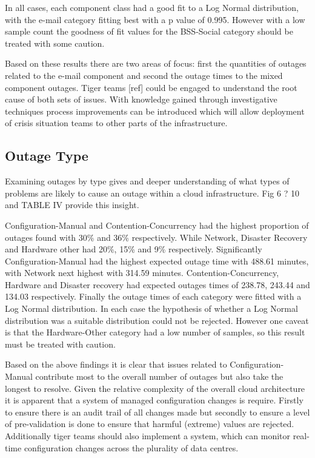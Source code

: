 \documentclass[conference]{IEEEtran}
\begin{document}
In all cases, each component class had a good fit to a Log Normal distribution, with the e-mail category fitting best with a p value of 0.995. However with a low sample count the goodness of fit values for the BSS-Social category should be treated with some caution. \par

Based on these results there are two areas of focus: first the quantities of outages related to the e-mail component and second the outage times to the mixed component outages. Tiger teams [ref] could be engaged to understand the root cause of both sets of issues. With knowledge gained through investigative techniques process improvements can be introduced which will allow deployment of crisis situation teams to other parts of the infrastructure. \par

\subsection{Outage Type}
Examining outages by type gives and deeper understanding of what types of problems are likely to cause an outage within a cloud infrastructure. Fig 6 ? 10 and TABLE IV provide this insight. \par

Configuration-Manual and Contention-Concurrency had the highest proportion of outages found with 30\% and 36\% respectively. While Network, Disaster Recovery and Hardware other had 20\%, 15\% and 9\% respectively. Significantly Configuration-Manual had the highest expected outage time with 488.61 minutes, with Network next highest with 314.59 minutes. Contention-Concurrency, Hardware and Disaster recovery had expected outages times of 238.78, 243.44 and 134.03 respectively. Finally the outage times of each category were fitted with a Log Normal distribution. In each case the hypothesis of whether a Log Normal distribution was a suitable distribution could not be rejected. However one caveat is that the Hardware-Other category had a low number of samples, so this result must be treated with caution. \par

Based on the above findings it is clear that issues related to Configuration-Manual contribute most to the overall number of outages but also take the longest to resolve.  Given the relative complexity of the overall cloud architecture it is apparent that a system of managed configuration changes is require. Firstly to ensure there is an audit trail of all changes made but secondly to ensure a level of pre-validation is done to ensure that harmful (extreme) values are rejected. Additionally tiger teams should also implement a system, which can monitor real-time configuration changes across the plurality of data centres.  \par
\end{document}
